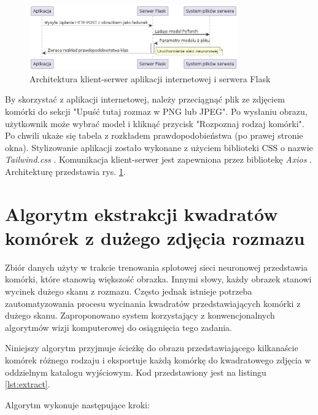 \begin{figure}
    \centering
    \includegraphics[width=0.8\textwidth]{arch}
    \caption{Architektura klient-serwer aplikacji internetowej i serwera Flask}
    \label{fig:arch}
\end{figure}

By skorzystać z aplikacji internetowej, należy przeciągnąć plik ze zdjęciem komórki do sekcji "Upuść tutaj rozmaz w PNG lub JPEG".
Po wysłaniu obrazu, użytkownik może wybrać model i kliknąć przycisk "Rozpoznaj rodzaj komórki".
Po chwili ukaże się tabela z rozkładem prawdopodobieństwa (po prawej stronie okna).
Stylizowanie aplikacji zostało wykonane z użyciem biblioteki CSS o nazwie \textit{Tailwind.css} \cite{tailwind}.
Komunikacja klient-serwer jest zapewniona przez bibliotekę \textit{Axios} \cite{axios}.
Architekturę przedstawia rys. \ref{fig:arch}.


\section{Algorytm ekstrakcji kwadratów komórek z dużego zdjęcia rozmazu}\label{sec:kwadraty}

Zbiór danych użyty w trakcie trenowania splotowej sieci neuronowej przedstawia komórki, które stanowią większość obrazka.
Innymi słowy, każdy obrazek stanowi wycinek dużego skanu z rozmazu.
Często jednak istnieje potrzeba zautomatyzowania procesu wycinania kwadratów przedstawiających komórki z dużego skanu.
Zaproponowano system korzystający z konwencjonalnych algorytmów wizji komputerowej do osiągnięcia tego zadania.

Niniejszy algorytm przyjmuje ścieżkę do obrazu przedstawiającego kilkanaście komórek różnego rodzaju i eksportuje
każdą komórkę do kwadratowego zdjęcia w oddzielnym katalogu wyjściowym.
Kod przedstawiony jest na listingu \ref{lst:extract}.



Algorytm wykonuje następujące kroki:


